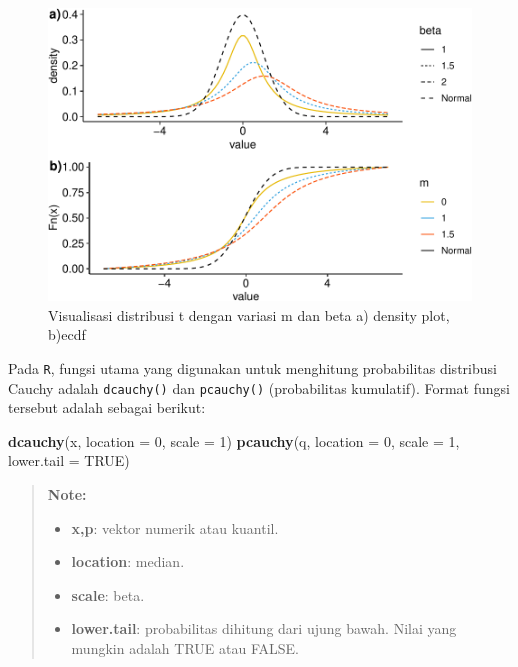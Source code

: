 \documentclass[]{book}
\newenvironment{Shaded}{\begin{snugshade}}{\end{snugshade}}
\newcommand{\KeywordTok}[1]{\textcolor[rgb]{0.13,0.29,0.53}{\textbf{#1}}}
\newcommand{\DataTypeTok}[1]{\textcolor[rgb]{0.13,0.29,0.53}{#1}}
\newcommand{\DecValTok}[1]{\textcolor[rgb]{0.00,0.00,0.81}{#1}}
\newcommand{\OtherTok}[1]{\textcolor[rgb]{0.56,0.35,0.01}{#1}}
\newcommand{\NormalTok}[1]{#1}
\providecommand{\tightlist}{%
  \setlength{\itemsep}{0pt}\setlength{\parskip}{0pt}}
\begin{document}
\begin{figure}

{\centering \includegraphics[width=0.9\linewidth]{EnvStat_files/figure-latex/dcauchyvis-1} 

}

\caption{Visualisasi distribusi t dengan variasi m dan beta a) density plot, b)ecdf}\label{fig:dcauchyvis}
\end{figure}

Pada \texttt{R}, fungsi utama yang digunakan untuk menghitung
probabilitas distribusi Cauchy adalah \texttt{dcauchy()} dan
\texttt{pcauchy()} (probabilitas kumulatif). Format fungsi tersebut
adalah sebagai berikut:

\begin{Shaded}
\begin{Highlighting}[]
\KeywordTok{dcauchy}\NormalTok{(x, }\DataTypeTok{location =} \DecValTok{0}\NormalTok{, }\DataTypeTok{scale =} \DecValTok{1}\NormalTok{)}
\KeywordTok{pcauchy}\NormalTok{(q, }\DataTypeTok{location =} \DecValTok{0}\NormalTok{, }\DataTypeTok{scale =} \DecValTok{1}\NormalTok{, }\DataTypeTok{lower.tail =} \OtherTok{TRUE}\NormalTok{)}
\end{Highlighting}
\end{Shaded}

\begin{quote}
\textbf{Note: }

\begin{itemize}
\tightlist
\item
  \textbf{x,p}: vektor numerik atau kuantil.
\item
  \textbf{location}: median.
\item
  \textbf{scale}: beta.
\item
  \textbf{lower.tail}: probabilitas dihitung dari ujung bawah. Nilai
  yang mungkin adalah TRUE atau FALSE.
\end{itemize}
\end{quote}
\end{document}
